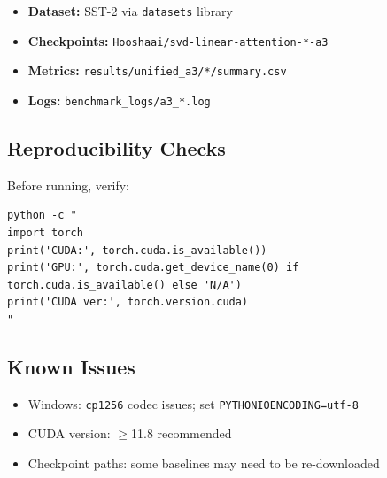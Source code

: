 \begin{itemize}
\item \textbf{Dataset:} SST-2 via \texttt{datasets} library
\item \textbf{Checkpoints:} \texttt{Hooshaai/svd-linear-attention-*-a3}
\item \textbf{Metrics:} \texttt{results/unified\_a3/*/summary.csv}
\item \textbf{Logs:} \texttt{benchmark\_logs/a3\_*.log}

\end{itemize}
\subsection{Reproducibility Checks}

Before running, verify:

\begin{lstlisting}
python -c "
import torch
print('CUDA:', torch.cuda.is_available())
print('GPU:', torch.cuda.get_device_name(0) if torch.cuda.is_available() else 'N/A')
print('CUDA ver:', torch.version.cuda)
"
\end{lstlisting}

\subsection{Known Issues}

\begin{itemize}
\item Windows: \texttt{cp1256} codec issues; set \texttt{PYTHONIOENCODING=utf-8}
\item CUDA version: $\ge$11.8 recommended
\item Checkpoint paths: some baselines may need to be re-downloaded
\end{itemize}

